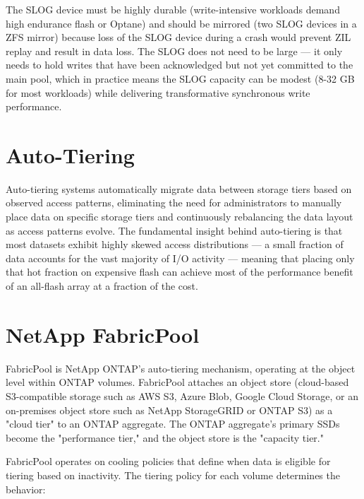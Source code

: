 The SLOG device must be highly durable (write-intensive workloads demand high endurance flash or Optane) and should be mirrored (two SLOG devices in a ZFS mirror) because loss of the SLOG device during a crash would prevent ZIL replay and result in data loss. The SLOG does not need to be large --- it only needs to hold writes that have been acknowledged but not yet committed to the main pool, which in practice means the SLOG capacity can be modest (8-32 GB for most workloads) while delivering transformative synchronous write performance.

\section{Auto-Tiering}
Auto-tiering systems automatically migrate data between storage tiers based on observed access patterns, eliminating the need for administrators to manually place data on specific storage tiers and continuously rebalancing the data layout as access patterns evolve. The fundamental insight behind auto-tiering is that most datasets exhibit highly skewed access distributions --- a small fraction of data accounts for the vast majority of I/O activity --- meaning that placing only that hot fraction on expensive flash can achieve most of the performance benefit of an all-flash array at a fraction of the cost.

\section{NetApp FabricPool}
FabricPool is NetApp ONTAP's auto-tiering mechanism, operating at the object level within ONTAP volumes. FabricPool attaches an object store (cloud-based S3-compatible storage such as AWS S3, Azure Blob, Google Cloud Storage, or an on-premises object store such as NetApp StorageGRID or ONTAP S3) as a "cloud tier" to an ONTAP aggregate. The ONTAP aggregate's primary SSDs become the "performance tier," and the object store is the "capacity tier."

FabricPool operates on cooling policies that define when data is eligible for tiering based on inactivity. The tiering policy for each volume determines the behavior:

